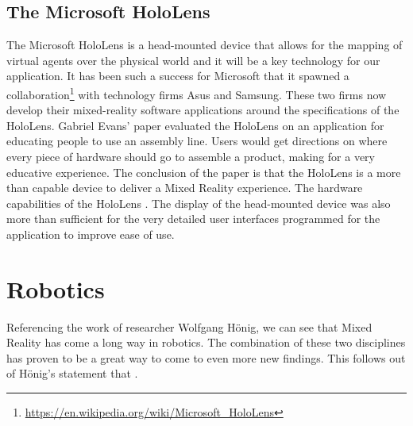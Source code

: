 \subsection{The Microsoft HoloLens}
The Microsoft HoloLens is a head-mounted device that allows for the mapping of virtual agents over the physical world and it will be a key technology for our application. It has been such a success for Microsoft that it spawned a collaboration\footnote{\protect\url{https://en.wikipedia.org/wiki/Microsoft\_HoloLens}} with technology firms Asus and Samsung. These two firms now develop their mixed-reality software applications around the specifications of the HoloLens.\newline
Gabriel Evans' paper\cite{evans2017evaluating} evaluated the HoloLens on an application for educating people to use an assembly line. Users would get directions on where every piece of hardware should go to assemble a product, making for a very educative experience. \newline
The conclusion of the paper is that the HoloLens is a more than capable device to deliver a Mixed Reality experience. The hardware capabilities of the HoloLens . The display of the head-mounted device was also more than sufficient for the very detailed user interfaces programmed for the application to improve ease of use. 

\section{Robotics}
Referencing the work of researcher Wolfgang H\"{o}nig\cite{hoenig2015mixed}, we can see that Mixed Reality has come a long way in robotics. The combination of these two disciplines has proven to be a great way to come to even more new findings. This follows out of H\"{o}nig's statement that  .

